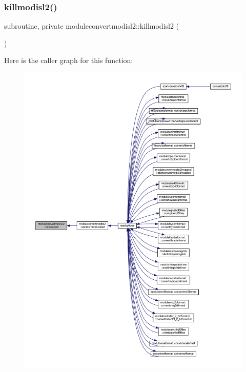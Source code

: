 \mbox{\label{namespacemoduleconvertmodisl2_ac166b6c8f2cb482fc76e22739ee0a87d}} 
\subsubsection{\texorpdfstring{killmodisl2()}{killmodisl2()}}
{\footnotesize\ttfamily subroutine, private moduleconvertmodisl2\+::killmodisl2 (\begin{DoxyParamCaption}{ }\end{DoxyParamCaption})\hspace{0.3cm}{\ttfamily [private]}}

Here is the caller graph for this function\+:\nopagebreak
\begin{figure}[H]
\begin{center}
\leavevmode
\includegraphics[width=350pt]{namespacemoduleconvertmodisl2_ac166b6c8f2cb482fc76e22739ee0a87d_icgraph}
\end{center}
\end{figure}
\mbox{\label{namespacemoduleconvertmodisl2_a95ba390f4da93899410109801bcd5011}} 
